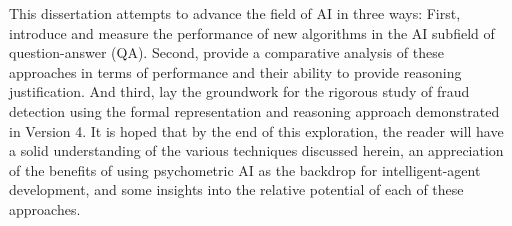 This dissertation attempts to advance the field of AI in three ways:  First, introduce and measure the performance of new algorithms in the AI subfield of question-answer (QA).  Second, provide a comparative analysis of these approaches in terms of performance and their ability to provide reasoning justification.  And third, lay the groundwork for the rigorous study of fraud detection using the formal representation and reasoning approach demonstrated in Version 4.  It is hoped that by the end of this exploration, the reader will have a solid understanding of the various techniques discussed herein, an appreciation of the benefits of using psychometric AI as the backdrop for intelligent-agent development, and some insights into the relative potential of each of these approaches.